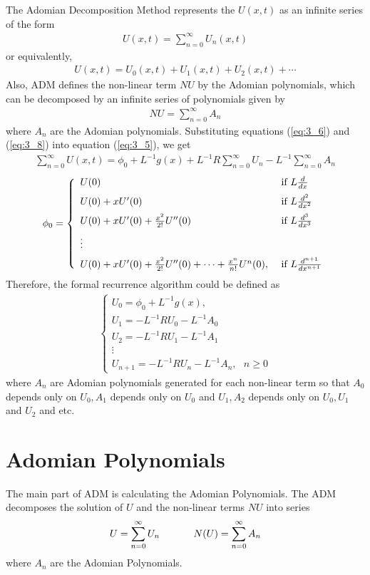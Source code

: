 \documentclass[11pt]{report}
\newcommand{\sps}{\\[0.2cm]}
\newcommand{\refn}[1]{(\ref{#1})}
\newcommand{\refx}[1]{\refn{eq:#1}}
\newcommand{\NI}{\noindent}
\newcommand{\sprime}{'}
\newcommand{\dprime}{''}
\begin{document}
	\NI The Adomian Decomposition Method represents the $U(x,t)$ as an infinite series of the form
	\begin{eqnarray}
		U(x,t) = \sum_{n=0}^{\infty}U_n(x,t)\label{eq:3_6}
	\end{eqnarray}
	or equivalently,
	\begin{eqnarray}
		U(x,t) = U_0(x,t) + U_1(x,t) + U_2(x,t) + \cdots
	\end{eqnarray}
	Also, ADM defines the non-linear term $NU$ by the Adomian polynomials, which can be decomposed by an infinite series of polynomials given by
	\begin{eqnarray}
		NU = \sum_{n=0}^{\infty}A_n\label{eq:3_8}
	\end{eqnarray}
	where $A_n$ are the Adomian polynomials. Substituting equations \refx{3_6} and \refx{3_8} into equation \refx{3_5}, we get
	\begin{eqnarray}
		\sum_{n=0}^{\infty}U(x,t) = \phi_0 + L^{-1}g(x) + L^{-1} R\sum_{n=0}^{\infty}U_n - L^{-1}\sum_{n=0}^{\infty}A_n
	\end{eqnarray}
	\begin{eqnarray}
		\phi_0 = \left\{
			\begin{array}{l l}
				U(0) & \text{ if } L \frac{d}{dx}\sps
				U(0) + xU\sprime(0) & \text{ if } L \frac{d^2}{dx^2}\sps
				U(0) + xU\sprime(0) + \frac{x^2}{2!}U\dprime(0) & \text{ if } L \frac{d^3}{dx^3}\sps
				\vdots\sps
				U(0) + xU\sprime(0) + \frac{x^2}{2!}U\dprime(0) + \cdots + \frac{x^n}{n!}U^n(0), & \text{ if } L \frac{d^{n+1}}{dx^{n+1}}
			\end{array}
		\right.
	\end{eqnarray}
	Therefore, the formal recurrence algorithm could be defined as
	\begin{eqnarray}
		\left\{
			\begin{array}{l}
				U_0 = \phi_0 + L^{-1} g(x),\sps
				U_1 = - L^{-1}RU_0 - L^{-1}A_0\sps
				U_2 = - L^{-1} RU_1 - L^{-1}A_1\\
				\vdots\\
				U_{n+1} = -L^{-1}RU_n - L^{-1}A_n,~~~ n\geq 0
			\end{array}
		\right.
	\end{eqnarray}
	where $A_n$ are Adomian polynomials generated for each non-linear term so that $A_0$ depends only on $U_0, A_1$ depends only on $U_0$ and $U_1, A_2$ depends only on $U_0,U_1$ and $U_2$ and etc.

	\section{Adomian Polynomials}
	The main part of ADM is calculating the Adomian Polynomials. The ADM decomposes the solution of $U$ and the non-linear terms $NU$ into series
	\begin{eqnarray}
		U = \sum_{n=0}^{\infty}U_n \hspace{1.2cm} N(U) = \sum_{n=0}^{\infty}A_n
	\end{eqnarray}
	where $A_n$ are the Adomian Polynomials.\\
	
\end{document}
